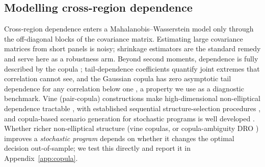 \documentclass[10pt,twocolumn]{article}
\begin{document}
\subsection{Modelling cross-region dependence}
Cross-region dependence enters a Mahalanobis--Wasserstein model only through the
off-diagonal blocks of the covariance matrix. Estimating large covariance matrices
from short panels is noisy; shrinkage estimators \citep{ledoit2004} are the standard
remedy and serve here as a robustness arm. Beyond second moments, dependence is
fully described by the copula \citep{sklar1959,joe2014}; tail-dependence
coefficients quantify joint extremes that correlation cannot see, and the Gaussian
copula has zero asymptotic tail dependence for any correlation below one
\citep{embrechts2002}, a property we use as a diagnostic benchmark.
Vine (pair-copula) constructions make high-dimensional non-elliptical dependence
tractable \citep{aas2009,joe2014,czado2019}, with established sequential
structure-selection procedures \citep{dissmann2013}, and copula-based scenario
generation for stochastic programs is well developed \citep{kaut2014}. Whether richer
non-elliptical structure (vine copulas, or copula-ambiguity DRO \citep{fan2024})
improves a \emph{stochastic program} depends on whether it changes the optimal decision
out-of-sample; we test this directly and report it in Appendix~\ref{app:copula}.
\end{document}
